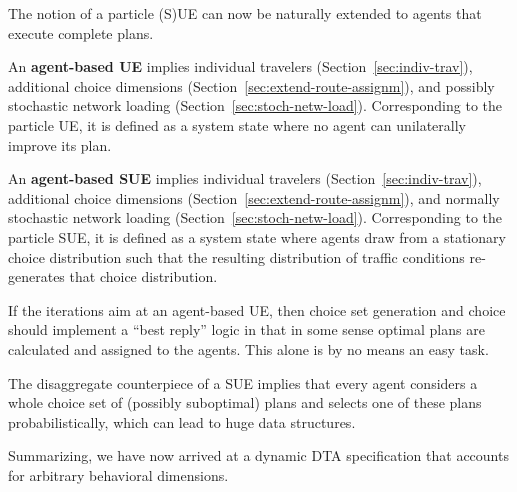 The notion of a particle (S)UE can now be naturally extended to agents 
that execute complete plans.

An \textbf{agent-based UE} implies individual travelers
(Section~\ref{sec:indiv-trav}), additional choice dimensions
(Section~\ref{sec:extend-route-assignm}), and possibly stochastic network
loading (Section~\ref{sec:stoch-netw-load}).  Corresponding to the
particle UE, it is defined as a system state where no agent can
unilaterally improve its plan.

An \textbf{agent-based SUE} implies individual travelers
(Section~\ref{sec:indiv-trav}), additional choice dimensions
(Section~\ref{sec:extend-route-assignm}), and normally stochastic network
loading (Section~\ref{sec:stoch-netw-load}).  Corresponding to the
particle SUE, it is defined as a system state where agents draw from a
stationary choice distribution such that the resulting distribution of
traffic conditions re-generates that choice distribution.

If the iterations aim at an agent-based UE, then choice set generation
and choice should implement a ``best reply'' logic in that in some
sense optimal plans are calculated and assigned to the agents. This
alone is by no means an easy task.  

The disaggregate counterpiece of a
SUE implies that every agent considers a whole choice set of (possibly
suboptimal) plans and selects one of these plans probabilistically,
which can lead to huge data structures.

Summarizing, we have now arrived at a dynamic DTA specification that accounts 
for arbitrary behavioral dimensions. 



